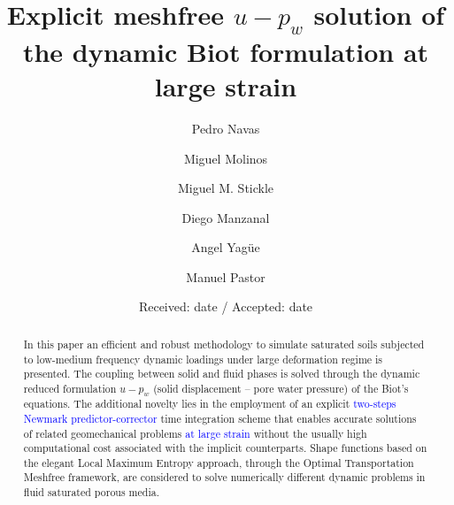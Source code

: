 \documentclass[twocolumn]{svjour3}          %
\begin{document}
\title{Explicit meshfree $u-p_w$ solution of the dynamic Biot formulation at large strain%
}


\author{Pedro Navas       \and
        Miguel Molinos \and
        Miguel M. Stickle \and
        Diego Manzanal \and
        Angel Yag\"ue \and
        Manuel Pastor
}



\date{Received: date / Accepted: date}


\maketitle

\begin{abstract}
In this paper an efficient and robust methodology to simulate saturated soils subjected to low-medium frequency dynamic loadings under large deformation regime is presented. The coupling between solid and fluid phases is solved through the dynamic reduced formulation $u-p_w$ (solid displacement -- pore water pressure) of the Biot's equations. The additional novelty lies in the employment of an explicit \textcolor{blue}{two-steps Newmark predictor-corrector} time integration scheme that enables accurate solutions of related geomechanical problems \textcolor{blue}{at large strain} without the usually high computational cost associated with the implicit counterparts. Shape functions based on the elegant Local Maximum Entropy approach, through the Optimal Transportation Meshfree framework, are considered to solve numerically different dynamic problems in fluid saturated porous media.
\end{abstract}
\end{document}
